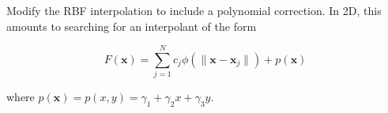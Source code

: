 Modify the RBF interpolation to include a polynomial correction. In 2D, this amounts to searching for an interpolant of
the form

$$
F(\bm{x}) = \sum\limits_{j=1}^N c_j \phi\left( \lVert \bm{x} - \bm{x}_j \rVert \right) + p(\bm{x})
$$

where $p(\bm{x}) = p(x, y) = \gamma_1 + \gamma_2 x + \gamma_3 y$.